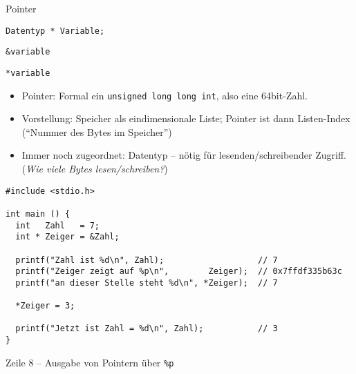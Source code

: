 \begin{frame}[fragile]{Pointer}
%
\small
%
\begin{codebox}
	\texttt{Datentyp * Variable;}
\end{codebox}
%
\begin{tcolorbox}[title=Adress-Operator]
	\texttt{&variable}
\end{tcolorbox}
\hspace{\fill}
\begin{tcolorbox}[title=Dereferenzierungs-Operator]
	\texttt{*variable}
\end{tcolorbox}
%
\begin{itemize}
\item Pointer: Formal ein \texttt{unsigned long long int}, also eine 64bit-Zahl.
\item Vorstellung: Speicher als eindimensionale Liste; Pointer ist dann Listen-Index\newline
	(\enquote{Nummer des Bytes im Speicher})
\item Immer noch zugeordnet: Datentyp -- nötig für lesenden/schreibender Zugriff.\newline
	(\emph{Wie viele Bytes lesen/schreiben?})
\end{itemize}
%
\end{frame}


\begin{frame}[fragile]
%
\begin{codebox}
\begin{verbatim}
#include <stdio.h>

int main () {
  int   Zahl   = 7;
  int * Zeiger = &Zahl;
  
  printf("Zahl ist %d\n", Zahl);                   // 7
  printf("Zeiger zeigt auf %p\n",        Zeiger);  // 0x7ffdf335b63c
  printf("an dieser Stelle steht %d\n", *Zeiger);  // 7
  
  *Zeiger = 3;
  
  printf("Jetzt ist Zahl = %d\n", Zahl);           // 3
}
\end{verbatim}
\end{codebox}
%
\begin{hintbox}
\small Zeile 8 -- Ausgabe von Pointern über \texttt{\%p}
\end{hintbox}
%
\end{frame}

